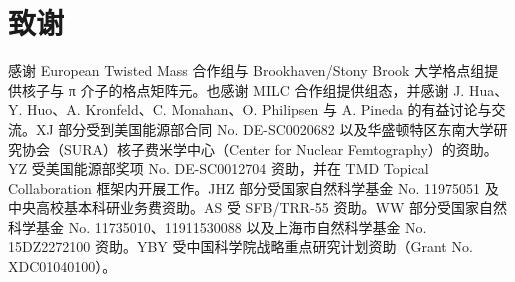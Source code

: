 \section*{致谢}

感谢 European Twisted Mass 合作组与 Brookhaven/Stony Brook 大学格点组提供核子与 π 介子的格点矩阵元。也感谢 MILC 合作组提供组态，并感谢 J. Hua、Y. Huo、A. Kronfeld、C. Monahan、O. Philipsen 与 A. Pineda 的有益讨论与交流。XJ 部分受到美国能源部合同 No. DE-SC0020682 以及华盛顿特区东南大学研究协会（SURA）核子费米学中心（Center for Nuclear Femtography）的资助。
YZ 受美国能源部奖项 No. DE-SC0012704 资助，并在 TMD Topical Collaboration 框架内开展工作。JHZ 部分受国家自然科学基金 No. 11975051 及中央高校基本科研业务费资助。AS 受 SFB/TRR-55 资助。WW 部分受国家自然科学基金 No. 11735010、11911530088 以及上海市自然科学基金 No. 15DZ2272100 资助。YBY 受中国科学院战略重点研究计划资助（Grant No. XDC01040100）。

